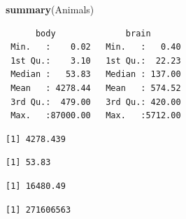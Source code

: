 \documentclass[]{article}
\newenvironment{Shaded}{\begin{snugshade}}{\end{snugshade}}
\newcommand{\KeywordTok}[1]{\textcolor[rgb]{0.13,0.29,0.53}{\textbf{#1}}}
\newcommand{\OperatorTok}[1]{\textcolor[rgb]{0.81,0.36,0.00}{\textbf{#1}}}
\newcommand{\NormalTok}[1]{#1}
\begin{document}
\begin{Shaded}
\begin{Highlighting}[]
\KeywordTok{summary}\NormalTok{(Animals)}
\end{Highlighting}
\end{Shaded}

\begin{verbatim}
      body              brain        
 Min.   :    0.02   Min.   :   0.40  
 1st Qu.:    3.10   1st Qu.:  22.23  
 Median :   53.83   Median : 137.00  
 Mean   : 4278.44   Mean   : 574.52  
 3rd Qu.:  479.00   3rd Qu.: 420.00  
 Max.   :87000.00   Max.   :5712.00  
\end{verbatim}

\begin{Shaded}
\end{Shaded}

\begin{verbatim}
[1] 4278.439
\end{verbatim}

\begin{Shaded}
\end{Shaded}

\begin{verbatim}
[1] 53.83
\end{verbatim}

\begin{Shaded}
\end{Shaded}

\begin{verbatim}
[1] 16480.49
\end{verbatim}

\begin{Shaded}
\end{Shaded}

\begin{verbatim}
[1] 271606563
\end{verbatim}
\end{document}
